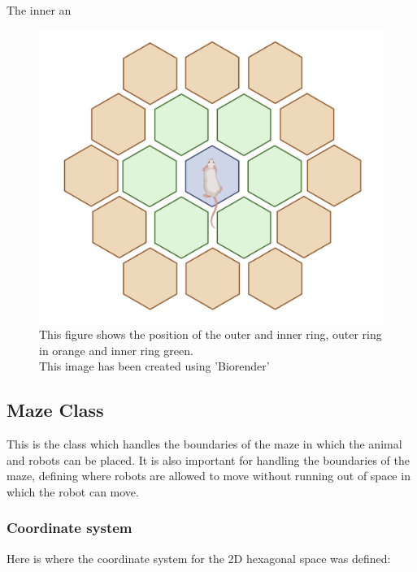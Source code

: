 The inner an

\begin{figure}
    \centering
    \includegraphics[scale = 0.5 ]{images/outer_rings.png}
    \caption{This figure shows the position of the outer and inner ring, outer ring in orange and inner ring green.\\ This image has been created using 'Biorender' \cite{biorender}}
    \label{fig:my_label}
\end{figure}




\subsection{Maze Class}

This is the class which handles the boundaries of the maze in which the animal and robots can be placed.
It is also important for handling the boundaries of the maze, defining where robots are allowed to move without running out of space in which the robot can move.

\subsubsection{Coordinate system}
Here is where the coordinate system for the 2D hexagonal space was defined:

